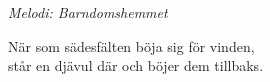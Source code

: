 {\footnotesize\textit{Melodi: Barndomshemmet}}\par
\vspace{10pt}
När som sädesfälten böja sig för vinden,\\
står en djävul där och böjer dem tillbaks.
